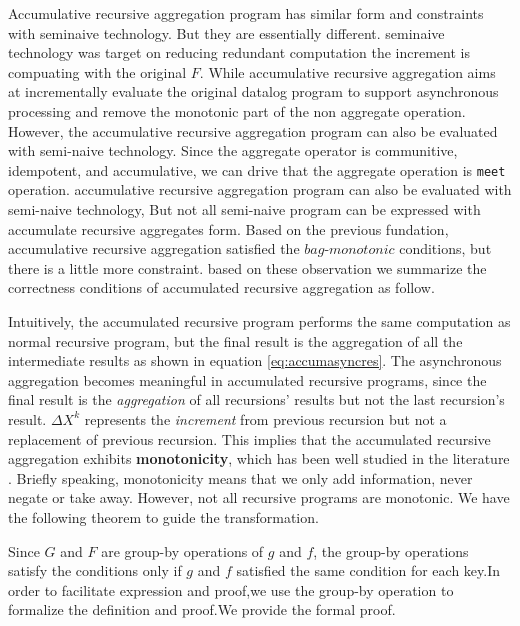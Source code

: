 {{\color{red}
Accumulative recursive aggregation program has similar form and constraints with seminaive technology. But they are essentially different.
seminaive technology was target on reducing redundant computation the increment is compuating with the original $F$. While accumulative recursive aggregation aims at incrementally evaluate the original datalog program to support asynchronous processing and remove the monotonic part of the non aggregate operation. However, the accumulative recursive aggregation program can also be evaluated with semi-naive technology. Since the aggregate operator is communitive, idempotent, and accumulative, we can drive that the aggregate operation is \texttt{meet} operation.
}
{\color{green}	
accumulative recursive aggregation program can also be evaluated with semi-naive technology, 
But not all semi-naive program can be expressed with accumulate recursive aggregates form.  %
Based on the previous fundation, accumulative recursive aggregation  satisfied the $bag$-$monotonic$ conditions, but there is a little more constraint.
based on these observation we summarize the correctness conditions of accumulated recursive aggregation as follow.
}


{\color{green}
Intuitively, the accumulated recursive program performs the same computation as normal recursive program, but the final result is the aggregation of all the intermediate results as shown in equation \ref{eq:accumasyncres}. The asynchronous aggregation becomes meaningful in accumulated recursive programs, since the final result is the \emph{aggregation} of all recursions' results but not the last recursion's result. $\Delta X^{k}$ represents the \emph{increment} from previous recursion but not a replacement of previous recursion. This implies that the accumulated recursive aggregation exhibits \textbf{monotonicity}, which has been well studied in the literature \cite{Hellerstein:2010:DIE:1860702.1860704,calm,Lam:2013:SDE:2510649.2511289,Wang:2015:AFR:2824032.2824052}. Briefly speaking, monotonicity means that we only add information, never negate or take away. However, not all recursive programs are monotonic. We have the following theorem to guide the transformation.
}

{\color{green}
Since $G$ and $F$ are group-by operations of $g$ and $f$, the group-by operations satisfy the conditions only if $g$ and $f$ satisfied the same condition for each key.In order to facilitate expression and proof,we use the group-by operation to formalize the definition and proof.We provide the formal proof.}

}
